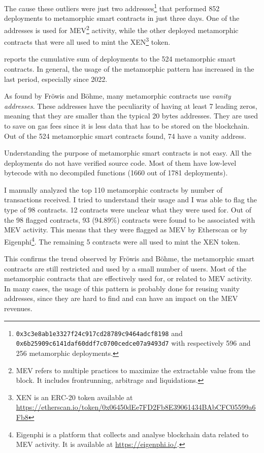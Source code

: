 The cause these outliers were just two addresses\footnote{{\tt 0x3c3e8ab1e3327f24c917cd28789c9464adcf8198} and \\{\tt 0x6b25909c6141daf60ddf7c0700cedce07a9493d7} with respectively 596 and 256 metamorphic deployments.} that performed 852 deployments to metamorphic smart contracts in just three days. One of the addresses is used for MEV\footnote{MEV refers to multiple practices to maximize the extractable value from the block. It includes frontrunning, arbitrage and liquidations.} activity, while the other deployed metamorphic contracts that were all used to mint the XEN\footnote{XEN is an ERC-20 token available at \url{https://etherscan.io/token/0x06450dEe7FD2Fb8E39061434BAbCFC05599a6Fb8}} token.

 reports the cumulative sum of deployments to the 524 metamorphic smart contracts. In general, the usage of the metamorphic pattern has increased in the last period, especially since 2022.

As found by Fröwis and Böhme, many metamorphic contracts use \textit{vanity addresses}. These addresses have the peculiarity of having at least 7 leading zeros, meaning that they are smaller than the typical 20 bytes addresses. They are used to save on gas fees since it is less data that has to be stored on the blockchain. Out of the 524 metamorphic smart contracts found, 74 have a vanity address.

Understanding the purpose of metamorphic smart contracts is not easy. All the deployments do not have verified source code. Most of them have low-level bytecode with no decompiled functions (1660 out of 1781 deployments). 

I manually analyzed the top 110 metamorphic contracts by number of transactions received. I tried to understand their usage and I was able to flag the type of 98 contracts. 12 contracts were unclear what they were used for. Out of the 98 flagged contracts, 93 (94.89\%) contracts were found to be associated with MEV activity. This means that they were flagged as MEV by Etherscan or by Eigenphi\footnote{Eigenphi is a platform that collects and analyse blockchain data related to MEV activity. It is available at \url{https://eigenphi.io/}.}. The remaining 5 contracts were all used to mint the XEN token. 

This confirms the trend observed by Fröwis and Böhme, the metamorphic smart contracts are still restricted and used by a small number of users. Most of the metamorphic contracts that are effectively used for, or related to MEV activity. In many cases, the usage of this pattern is probably done for reusing vanity addresses, since they are hard to find and can have an impact on the MEV revenues.

